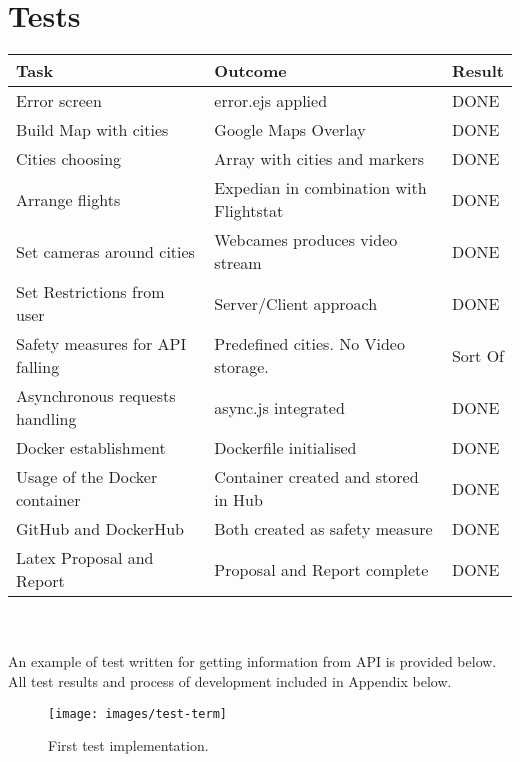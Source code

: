 \documentclass[12pt]{article}
\numberwithin{equation}{section} %
\numberwithin{figure}{section} %
\numberwithin{table}{section} %
\begin{document}
\section{Tests}	
	\begin{tabularx}{\textwidth}{X|l|l}
		\textbf{Task} & \textbf{Outcome} & Result \\
		\hline
		Error screen & error.ejs applied & \cellcolor{green!25}DONE\\
		\hline
		Build Map with cities & Google Maps Overlay & \cellcolor{green!25}DONE\\
		\hline
		Cities choosing & Array with cities and markers & \cellcolor{green!25}DONE\\
		\hline
		Arrange flights & Expedian in combination with Flightstat & \cellcolor{green!25}DONE\\
		\hline
		Set cameras around cities & Webcames produces video stream & \cellcolor{green!25}DONE\\
		\hline
		Set Restrictions from user & Server/Client approach & \cellcolor{green!25}DONE\\
		\hline
		Safety measures for API falling & Predefined cities. No Video storage. & \cellcolor{green!10}Sort Of\\
		\hline
		Asynchronous requests handling & async.js integrated & \cellcolor{green!25}DONE\\
		\hline
		Docker establishment & Dockerfile initialised & \cellcolor{green!25}DONE\\
		\hline
		Usage of the Docker container & Container created and stored in Hub & \cellcolor{green!25}DONE\\
		\hline		
		GitHub and DockerHub & Both created as safety measure & \cellcolor{green!25}DONE\\
		\hline
		Latex Proposal and Report & Proposal and Report complete & \cellcolor{green!25}DONE\\
		\hline
	\end{tabularx}
	 \\ \\
	An example of test written for getting information from API is provided below. All test results and process of development included in Appendix below.
	\begin{figure}[H]
		\centering		
		\texttt{[image: images/test-term]}
		\caption{First test implementation.}
		
	\end{figure}
\begin{flushleft}
	
	
\end{flushleft}
\end{document}
